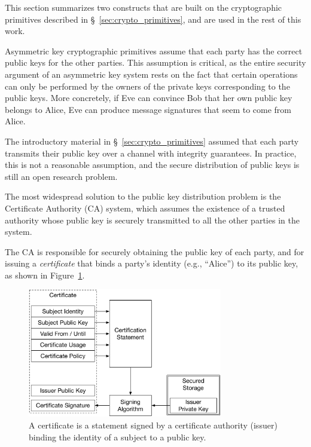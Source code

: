 \label{sec:crypto_constructs}

This section summarizes two constructs that are built on the cryptographic
primitives described in \S~\ref{sec:crypto_primitives}, and are used in the
rest of this work.


\label{sec:certificates}

Asymmetric key cryptographic primitives assume that each party has the correct
public keys for the other parties. This assumption is critical, as the entire
security argument of an asymmetric key system rests on the fact that certain
operations can only be performed by the owners of the private keys
corresponding to the public keys. More concretely, if Eve can convince Bob
that her own public key belongs to Alice, Eve can produce message signatures
that seem to come from Alice.

The introductory material in \S~\ref{sec:crypto_primitives} assumed that each
party transmits their public key over a channel with integrity guarantees. In
practice, this is not a reasonable assumption, and the secure distribution of
public keys is still an open research problem.

The most widespread solution to the public key distribution problem is the
Certificate Authority (CA) system, which assumes the existence of a trusted
authority whose public key is securely transmitted to all the other parties in
the system.

The CA is responsible for securely obtaining the public key of each party, and
for issuing a \textit{certificate} that binds a party's identity (e.g.,
``Alice'') to its public key, as shown in Figure~\ref{fig:certificate}.

\begin{figure}[hbt]
  \centering
  \includegraphics[width=85mm]{figures/certificate.pdf}
  \caption{
    A certificate is a statement signed by a certificate authority (issuer)
    binding the identity of a subject to a public key.
  }
  \label{fig:certificate}
\end{figure}

